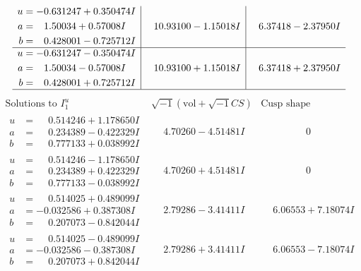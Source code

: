 \documentclass[1p]{elsarticle_modified}
\theoremstyle{definition}
\newcommand{\I}{\sqrt{-1}}
\begin{document}
$$\begin{array}{c|c|c}
\begin{aligned}
u &= -0.631247 + 0.350474 I \\
a &= \phantom{-}1.50034 + 0.57008 I \\
b &= \phantom{-}0.428001 - 0.725712 I\end{aligned}
 & \phantom{-}10.93100 - 1.15018 I & \phantom{-}6.37418 - 2.37950 I \\ \hline\begin{aligned}
u &= -0.631247 - 0.350474 I \\
a &= \phantom{-}1.50034 - 0.57008 I \\
b &= \phantom{-}0.428001 + 0.725712 I\end{aligned}
 & \phantom{-}10.93100 + 1.15018 I & \phantom{-}6.37418 + 2.37950 I\\
 \hline 
 \end{array}$$\newpage$$\begin{array}{c|c|c}  
\text{Solutions to }I^u_{1}& \I (\text{vol} + \sqrt{-1}CS) & \text{Cusp shape}\\
 \hline 
\begin{aligned}
u &= \phantom{-}0.514246 + 1.178650 I \\
a &= \phantom{-}0.234389 - 0.422329 I \\
b &= \phantom{-}0.777133 + 0.038992 I\end{aligned}
 & \phantom{-}4.70260 - 4.51481 I & \phantom{-0.000000 } 0 \\ \hline\begin{aligned}
u &= \phantom{-}0.514246 - 1.178650 I \\
a &= \phantom{-}0.234389 + 0.422329 I \\
b &= \phantom{-}0.777133 - 0.038992 I\end{aligned}
 & \phantom{-}4.70260 + 4.51481 I & \phantom{-0.000000 } 0 \\ \hline\begin{aligned}
u &= \phantom{-}0.514025 + 0.489099 I \\
a &= -0.032586 + 0.387308 I \\
b &= \phantom{-}0.207073 - 0.842044 I\end{aligned}
 & \phantom{-}2.79286 - 3.41411 I & \phantom{-}6.06553 + 7.18074 I \\ \hline\begin{aligned}
u &= \phantom{-}0.514025 - 0.489099 I \\
a &= -0.032586 - 0.387308 I \\
b &= \phantom{-}0.207073 + 0.842044 I\end{aligned}
 & \phantom{-}2.79286 + 3.41411 I & \phantom{-}6.06553 - 7.18074 I \\ \hline\begin{aligned}

\end{aligned}
\end{array}$$
\end{document}

